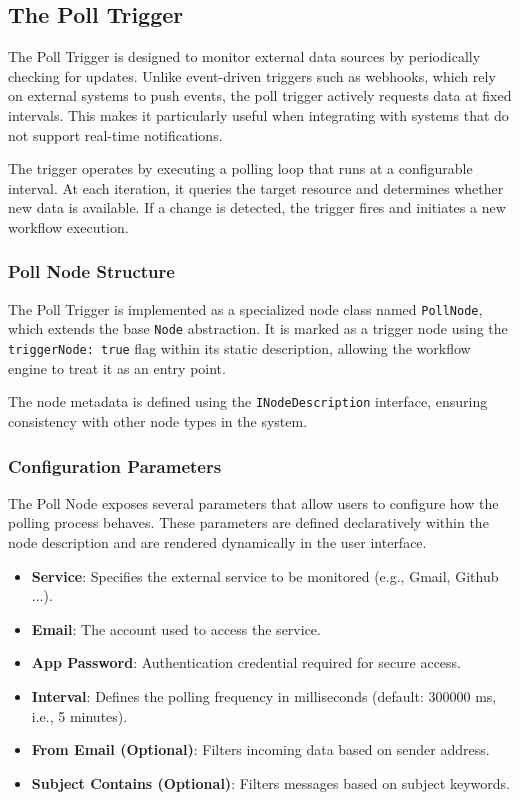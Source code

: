 \subsection{The Poll Trigger}
The Poll Trigger is designed to monitor external data sources by periodically checking for updates. Unlike event-driven triggers such as webhooks, which rely on external systems to push events, the poll trigger actively requests data at fixed intervals. This makes it particularly useful when integrating with systems that do not support real-time notifications.

The trigger operates by executing a polling loop that runs at a configurable interval. At each iteration, it queries the target resource and determines whether new data is available. If a change is detected, the trigger fires and initiates a new workflow execution.

\subsubsection{Poll Node Structure}

The Poll Trigger is implemented as a specialized node class named \texttt{PollNode}, which extends the base \texttt{Node} abstraction. It is marked as a trigger node using the \texttt{triggerNode: true} flag within its static description, allowing the workflow engine to treat it as an entry point.

The node metadata is defined using the \texttt{INodeDescription} interface, ensuring consistency with other node types in the system. 

\subsubsection{Configuration Parameters}

The Poll Node exposes several parameters that allow users to configure how the polling process behaves. These parameters are defined declaratively within the node description and are rendered dynamically in the user interface.

\begin{itemize}
    \item \textbf{Service}: Specifies the external service to be monitored (e.g., Gmail, Github ...).
    \item \textbf{Email}: The account used to access the service.
    \item \textbf{App Password}: Authentication credential required for secure access.
    \item \textbf{Interval}: Defines the polling frequency in milliseconds (default: 300000 ms, i.e., 5 minutes).
    \item \textbf{From Email (Optional)}: Filters incoming data based on sender address.
    \item \textbf{Subject Contains (Optional)}: Filters messages based on subject keywords.
\end{itemize}

